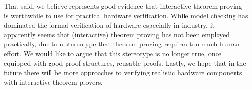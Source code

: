 That said, we believe \hemiola{} represents good evidence that interactive theorem proving is worthwhile to use for practical hardware verification.
While model checking has dominated the formal verification of hardware especially in industry, it apparently seems that (interactive) theorem proving has not been employed practically, due to a stereotype that theorem proving requires too much human effort.
We would like to argue that this stereotype is no longer true, once equipped with good proof structures, \eg{} reusable proofs.
Lastly, we hope that in the future there will be more approaches to verifying realistic hardware components with interactive theorem provers.
